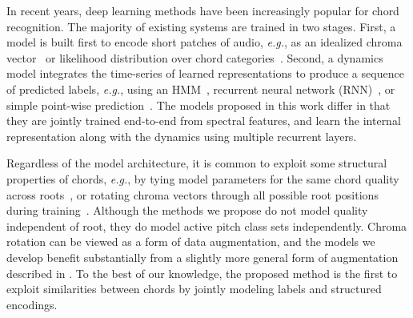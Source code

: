 \documentclass{article}
\def\eg{\emph{e.g.}}
\begin{document}


%   

In recent years, deep learning methods have been increasingly popular for chord recognition.
The majority of existing systems are trained in two stages. 
First, a model is built first to encode short patches of audio, \eg, as an idealized chroma vector~\cite{boulanger2013audio,korzeniowski2016feature} or likelihood distribution over chord categories~\cite{humphrey2015four,sigtia2015audio,zhou2015chord,deng2016hybrid}.
Second, a dynamics model integrates the time-series of learned representations to produce a sequence of predicted labels, \eg, using an HMM~\cite{humphrey2015four,zhou2015chord}, recurrent neural network (RNN)~\cite{boulanger2013audio,sigtia2015audio}, or simple point-wise prediction~\cite{korzeniowski2016feature}.
The models proposed in this work differ in that they are jointly trained end-to-end from spectral features, and learn the internal representation along with the dynamics using multiple recurrent layers.

Regardless of the model architecture, it is common to exploit some structural properties of chords, \eg, by tying model parameters for the same chord quality across roots~\cite{humphrey2015four}, or rotating chroma vectors through all possible root positions during training~\cite{cho2014improved}.
Although the methods we propose do not model quality independent of root, they do model active pitch class sets independently.
Chroma rotation can be viewed as a form of data augmentation, and the models we develop benefit substantially from a slightly more general form of augmentation described in .
To the best of our knowledge, the proposed method is the first to exploit similarities between chords by jointly modeling labels and structured encodings.

\end{document}

